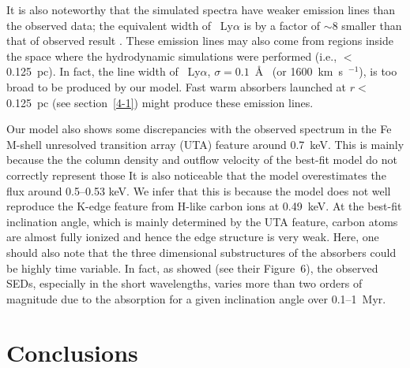 \documentclass[twocolumn,times,twocolappendix]{aastex63}
\begin{document}
It is also noteworthy that the simulated spectra have weaker emission lines
than the observed data; 
the equivalent width of ~Ly$\alpha$
  is by a factor of $\sim$8
smaller than that of observed result \citep{Mizumoto2017}.
These emission lines may also come from
regions inside the space where the hydrodynamic simulations were
performed (i.e., $<$0.125~pc). In fact, 
the line width of ~Ly$\alpha$,
$\sigma = 0.1$~\AA\ \citep{Mizumoto2017} (or 1600~km~s~$^{-1}$),
is too broad to be produced by our model.
Fast warm absorbers launched at $r<$0.125~pc 
(see section~\ref{4-1}) might produce these emission lines. 

Our model also shows some discrepancies with the observed spectrum
in the Fe M-shell unresolved transition array (UTA) feature 
around 0.7~keV. This is mainly because the
the column density and outflow velocity of 
the best-fit model do not correctly represent those
It is also noticeable that the model 
overestimates the flux around 0.5--0.53 keV.
We infer that this is because the model does not well reproduce the K-edge
feature 
from H-like carbon ions at 0.49~keV\citep{NIST_ASD}.
At the best-fit inclination angle, which is mainly determined by the UTA feature, carbon atoms are almost fully ionized and hence the edge structure is very weak.
Here, one should also note that the 
three dimensional substructures of the absorbers could be highly time variable.
In fact, 
as \citet{Schartmann2014} showed (see their Figure~6), the observed SEDs, especially in the short wavelengths, varies more than two orders of magnitude
due to the absorption for a given inclination angle over 0.1--1~Myr.







\section{Conclusions}
\label{sec5}
\end{document}
